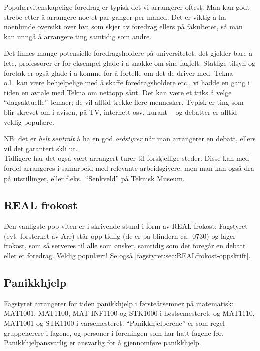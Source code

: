 Populærvitenskapelige foredrag er typisk det vi arrangerer oftest.
Man kan godt strebe etter å arrangere noe et par ganger per måned.
Det er viktig å ha noenlunde oversikt over hva som skjer av foredrag ellers
på fakultetet, så man kan unngå å arrangere ting samtidig som andre.

Det finnes mange potensielle foredragsholdere på universitetet, det gjelder bare
å lete, professorer er for eksempel glade i å snakke om sine fagfelt.
Statlige tilsyn og foretak er også glade i å komme for å fortelle om det de
driver med.
Tekna o.l.~kan være behjelpelige med å skaffe foredragsholdere etc., vi hadde en
gang i tiden en avtale med Tekna om nettopp sånt.
Det kan være et triks å velge ``dagsaktuelle'' temaer; de vil alltid trekke
flere mennesker.  Typisk er ting som blir skrevet om i avisen, på TV, internett
osv. kurant -- og debatter er alltid veldig populære.

NB: det er \emph{helt sentralt} å ha en god \emph{ordstyrer} når man
arrangerer en debatt, ellers vil det garantert skli ut.\\

Tidligere har det også vært arrangert turer til forskjellige steder.
Disse kan med fordel arrangeres i samarbeid med relevante arbeidsgivere, 
men man kan også dra på utstillinger,
eller f.eks.~``Senkveld'' på Teknisk Museum.

\subsection{REAL frokost}
Den vanligste pop-viten er i skrivende stund i form av REAL frokost:
Fagstyret (evt. forsterket av Arr) står opp tidlig (de er på blindern
ca.~0730) og lager frokost, som så serveres til alle som ønsker, samtidig som
det foregår en debatt eller et foredrag.
Veldig populært!
Se også \ref{fagstyret:sec:REALfrokost-oppskrift}.

\subsection{Panikkhjelp}
Fagstyret arrangerer for tiden panikkhjelp i første\-års\-emner på matematisk:
MAT1001, MAT1100, MAT-INF1100 og STK1000 i høstsemesteret, og MAT1110, MAT1001
 og STK1100 i vårsemesteret. ``Panikkhjelperene'' er som regel gruppelærere i
fagene, og personer i foreningen som har hatt fagene før.
Panikkhjelpansvarlig er ansvarlig for å gjennomføre panikkhjelp.

